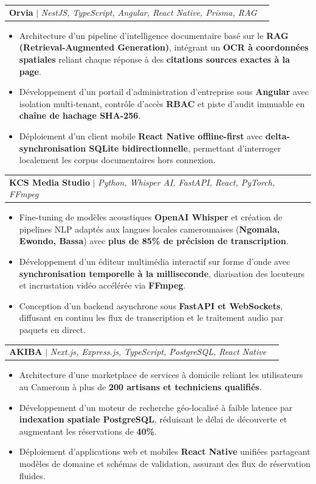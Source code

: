 \documentclass[letterpaper,10pt]{article}
\makeatletter
\newcommand{\resumeItem}[1]{
  \item\small{
    {#1 \vspace{-1.5pt}}
  }
}
\newcommand{\resumeProjectHeading}[2]{
    \item
    \begin{tabular*}{0.98\textwidth}{l@{\extracolsep{\fill}}r}
      \small#1 & #2 \\
    \end{tabular*}\vspace{-5pt}
}
\newcommand{\resumeItemListStart}{\begin{itemize}[leftmargin=0.2in, label={$\vcenter{\hbox{\tiny$\bullet$}}$}, itemsep=1.2pt, parsep=0pt]}
\newcommand{\resumeItemListEnd}{\end{itemize}\vspace{-3pt}}
\makeatother
\begin{document}
    \resumeProjectHeading
        {\textbf{Orvia} $|$ \emph{NestJS, TypeScript, Angular, React Native, Prisma, RAG}}{}
        \resumeItemListStart
          \resumeItem{Architecture d'un pipeline d'intelligence documentaire basé sur le \textbf{RAG (Retrieval-Augmented Generation)}, intégrant un \textbf{OCR à coordonnées spatiales} reliant chaque réponse à des \textbf{citations sources exactes à la page}.}
          \resumeItem{Développement d'un portail d'administration d'entreprise sous \textbf{Angular} avec isolation multi-tenant, contrôle d'accès \textbf{RBAC} et piste d'audit immuable en \textbf{chaîne de hachage SHA-256}.}
          \resumeItem{Déploiement d'un client mobile \textbf{React Native offline-first} avec \textbf{delta-synchronisation SQLite bidirectionnelle}, permettant d'interroger localement les corpus documentaires hors connexion.}
        \resumeItemListEnd

    \resumeProjectHeading
        {\textbf{KCS Media Studio} $|$ \emph{Python, Whisper AI, FastAPI, React, PyTorch, FFmpeg}}{}
        \resumeItemListStart
          \resumeItem{Fine-tuning de modèles acoustiques \textbf{OpenAI Whisper} et création de pipelines NLP adaptés aux langues locales camerounaises (\textbf{Ngomala, Ewondo, Bassa}) avec \textbf{plus de 85\% de précision de transcription}.}
          \resumeItem{Développement d'un éditeur multimédia interactif sur forme d'onde avec \textbf{synchronisation temporelle à la milliseconde}, diarisation des locuteurs et incrustation vidéo accélérée via \textbf{FFmpeg}.}
          \resumeItem{Conception d'un backend asynchrone sous \textbf{FastAPI et WebSockets}, diffusant en continu les flux de transcription et le traitement audio par paquets en direct.}
        \resumeItemListEnd

    \pagebreak

    \resumeProjectHeading
        {\textbf{AKIBA} $|$ \emph{Next.js, Express.js, TypeScript, PostgreSQL, React Native}}{}
        \resumeItemListStart
          \resumeItem{Architecture d'une marketplace de services à domicile reliant les utilisateurs au Cameroun à plus de \textbf{200 artisans et techniciens qualifiés}.}
          \resumeItem{Développement d'un moteur de recherche géo-localisé à faible latence par \textbf{indexation spatiale PostgreSQL}, réduisant le délai de découverte et augmentant les réservations de \textbf{40\%}.}
          \resumeItem{Déploiement d'applications web et mobiles \textbf{React Native} unifiées partageant modèles de domaine et schémas de validation, assurant des flux de réservation fluides.}
        \resumeItemListEnd
\end{document}

